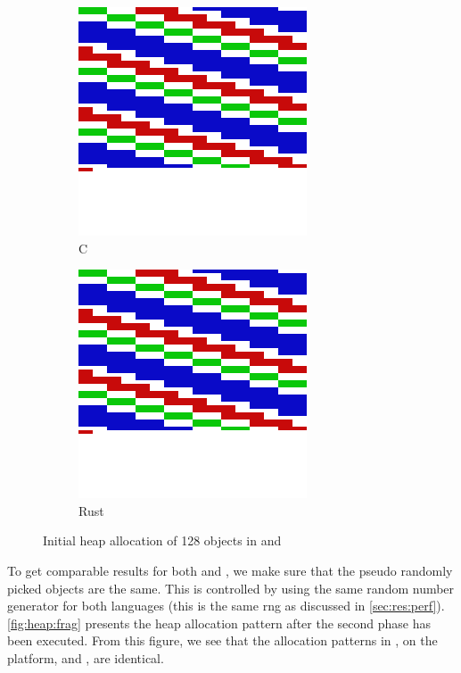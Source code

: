 \begin{figure}[H]

  \centering
  \begin{subfigure}{0.47\textwidth}
    \centering
    \includegraphics[scale=0.15]{results/plots/heap/cinit}
    \caption{C}
    \label{fig:heap:init:c}
  \end{subfigure}
  \hfill
  \begin{subfigure}{0.47\textwidth}
      \centering
    \includegraphics[scale=0.15]{results/plots/heap/rinit}
    \caption{Rust}
    \label{fig:heap:init:r}
  \end{subfigure}
  \caption{Initial heap allocation of 128 objects in {\rust} and {\C}}
  \label{fig:heap:init}

\end{figure}

To get comparable results for both {\C} and {\rust}, we make sure that the pseudo randomly picked objects are the same.
This is controlled by using the same random number generator for both languages (this is the same \gls{rng} as discussed in \autoref{sec:res:perf}).
\autoref{fig:heap:frag} presents the heap allocation pattern after the second phase has been executed.
From this figure, we see that the allocation patterns in {\rust}, on the {\rg} platform, and {\C}, are identical.

